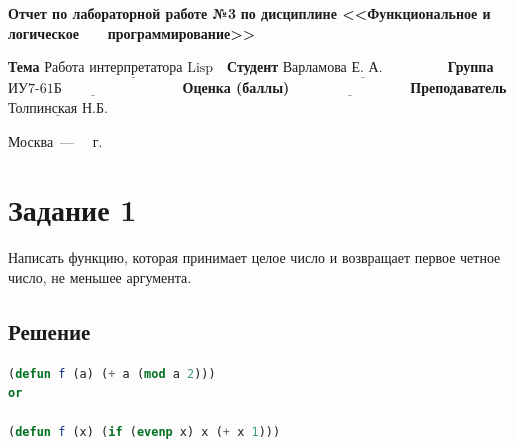 \documentclass[12pt]{report}
\begin{document}
\begin{titlepage}
		\begin{center}
			\noindent\begin{minipage}{1.1\textwidth}\centering
				\Large\textbf{  Отчет по лабораторной работе №3}\newline
				\textbf{по дисциплине <<Функциональное и логическое}\newline
				\textbf{~~~программирование>>}\newline\newline
			\end{minipage}
		\end{center}
		
		\noindent\textbf{Тема} $\underline{\text{Работа интерпретатора Lisp~~}}$\newline\newline
		\noindent\textbf{Студент} $\underline{\text{Варламова Е. А.~~~~~~~~~~~~~}}$\newline\newline
		\noindent\textbf{Группа} $\underline{\text{ИУ7-61Б~~~~~~~~~~~~~~~~~~~~~~~~~}}$\newline\newline
		\noindent\textbf{Оценка (баллы)} $\underline{\text{~~~~~~~~~~~~~~~~~~~~~~~~}}$\newline\newline
		\noindent\textbf{Преподаватель} $\underline{\text{Толпинская Н.Б.}}$\newline\newline\newline
		
		\begin{center}
			\vfill
			Москва~---~\the\year
			~г.
		\end{center}
	\end{titlepage}
	
	
	
\section*{Задание 1}
Написать функцию, которая принимает целое число и возвращает первое четное число, не меньшее аргумента.
\subsection*{Решение}

\begin{lstlisting}[label=first,caption=Решение задания №1, language=lisp]
(defun f (a) (+ a (mod a 2)))
or

(defun f (x) (if (evenp x) x (+ x 1)))
\end{lstlisting}
\end{document}
